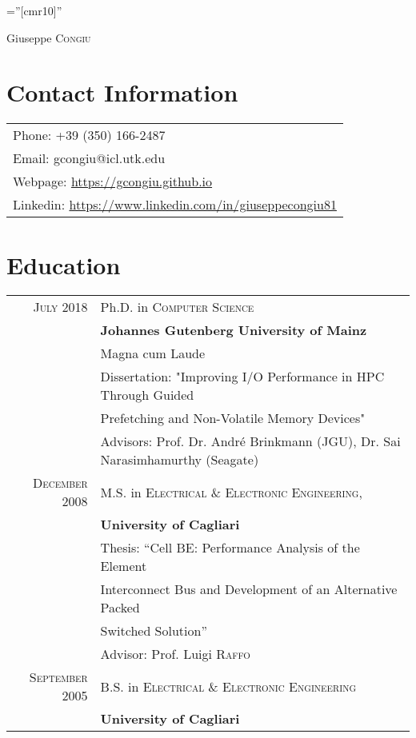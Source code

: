 \documentclass[a4paper,10pt]{article}
\begin{document}
\pagestyle{empty} %

\font\fb=''[cmr10]'' %

\par{\centering
	{\Huge Giuseppe \textsc{Congiu}
}\bigskip\par}

\section{Contact Information}

\begin{tabular}{l}
    Phone: +39 (350) 166-2487 \\
    Email: gcongiu@icl.utk.edu \\
    Webpage: \url{https://gcongiu.github.io} \\
    Linkedin: \url{https://www.linkedin.com/in/giuseppecongiu81}
\end{tabular}

\section{Education}
\begin{tabular}{rp{11cm}}
\textsc{July 2018} & Ph.D. in \textsc{Computer Science}\\
          & \textbf{Johannes Gutenberg University of Mainz} \\
          & Magna cum Laude \\
          & Dissertation: "Improving I/O Performance in HPC Through Guided\\
          & Prefetching and Non-Volatile Memory Devices"\\
          & \small Advisors: Prof. Dr. Andr\'e Brinkmann (JGU), Dr. Sai Narasimhamurthy (Seagate)\\

\textsc{December} 2008 & M.S. in \textsc{Electrical \& Electronic Engineering}, \\
              & \textbf{University of Cagliari}\\
              & Thesis: ``Cell BE: Performance Analysis of the Element\\
              & Interconnect Bus and Development of an Alternative Packed\\
              & Switched Solution'' \\
              & \small Advisor: Prof. Luigi \textsc{Raffo}\\

\textsc{September} 2005 & B.S. in \textsc{Electrical \& Electronic Engineering} \\
               & \textbf{University of Cagliari}\\
\end{tabular}
\end{document}
